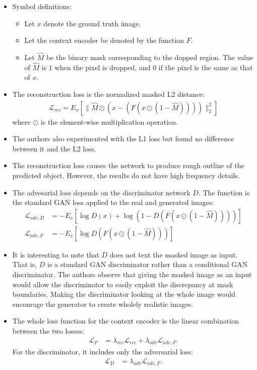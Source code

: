 \documentclass[10pt]{article}
\begin{document}
  \begin{itemize}
  	\item Symbol definitions:
  	\begin{itemize}
  		\item Let $x$ denote the ground truth image. 
  		\item Let the context encoder be denoted by the function $F$.
  		\item Let $\hat{M}$ be the binary mask corresponding to the dopped region. The value of $\hat{M}$ is $1$ when the pixel is dropped, and $0$ if the pixel is the same as that of $x$.
  	\end{itemize}

  	\item The reconstruction loss is the normalized masked L2 distance:
  	\begin{align*}
  		\mathcal{L}_{rec} = E_x [\| \hat{M} \odot (x - (F(x \odot (1 - \hat{M})))) \|_2^2]
  	\end{align*}
  	where $\odot$ is the element-wise multiplication operation. 

  	\item The authors also experimented with the L1 loss but found no difference between it and the L2 loss.

  	\item The reconstruction loss causes the network to produce rough outline of the predicted object. However, the results do not have high frequency details.

  	\item The advesarial loss depends on the discriminator network $D$. The function is the standard GAN loss applied to the real and generated images:
  	\begin{align*}
  		\mathcal{L}_{adv,D} &= - E_{x} [\log D(x) + \log (1 - D(F(x \odot (1-\hat{M}))))] \\
  		\mathcal{L}_{adv,F} &= - E_{x} [\log D(F(x \odot (1-\hat{M})))]
  	\end{align*}

  	\item It is interesting to note that $D$ does not text the masked image as input. That is, $D$ is a standard GAN discriminator rather than a conditional GAN discriminator. The authors observe that giving the masked image as an input would allow the discriminator to easily exploit the discrepancy at mask boundaries. Making the discriminator looking at the whole image would encourage the generator to create wholely realistic images.

  	\item The whole loss function for the context encoder is the linear combination between the two losses:
  	\begin{align*}
  		\mathcal{L}_F 
  		&= \lambda_{rec} \mathcal{L}_{rec} + \lambda_{adv} \mathcal{L}_{adv,F}.
  	\end{align*}
  	For the discriminator, it includes only the adversarial loss:
  	\begin{align*}
  		\mathcal{L}_D &= \lambda_{adv} \mathcal{L}_{adv,F}.
  	\end{align*}
  	
  \end{itemize}
\end{document}
